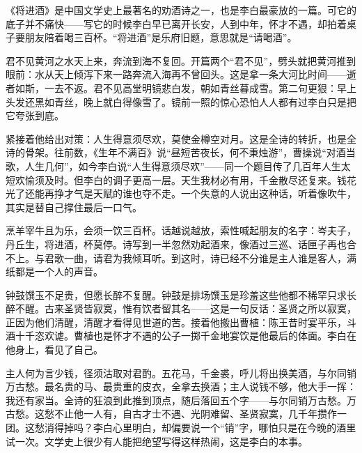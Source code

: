 \begin{appreciation}
《将进酒》是中国文学史上最著名的劝酒诗之一，也是李白最豪放的一篇。可它的底子并不痛快——写它的时候李白早已离开长安，人到中年，怀才不遇，却拍着桌子要朋友陪着喝三百杯。“将进酒”是乐府旧题，意思就是“请喝酒”。

君不见黄河之水天上来，奔流到海不复回。开篇两个“君不见”，劈头就把黄河推到眼前：水从天上倾泻下来一路奔流入海再不曾回头。这是拿一条大河比时间——逝者如斯，一去不返。君不见高堂明镜悲白发，朝如青丝暮成雪。第二句更狠：早上头发还黑如青丝，晚上就白得像雪了。镜前一照的惊心恐怕人人都有过李白只是把它夸张到底。

紧接着他给出对策：人生得意须尽欢，莫使金樽空对月。这是全诗的转折，也是全诗的骨架。往前数，《生年不满百》说“昼短苦夜长，何不秉烛游”，曹操说“对酒当歌，人生几何”，如今李白说“人生得意须尽欢”——同一个题目传了几百年人生太短欢愉须及时。但李白的调子更高一层。天生我材必有用，千金散尽还复来。钱花光了还能再挣才气是天赋的谁也夺不走。一个失意的人说出这种话，听着像吹牛，其实是替自己撑住最后一口气。

烹羊宰牛且为乐，会须一饮三百杯。话越说越放，索性喊起朋友的名字：岑夫子，丹丘生，将进酒，杯莫停。诗写到一半忽然劝起酒来，像酒过三巡、话匣子再也合不上。与君歌一曲，请君为我倾耳听。到这时，诗已经不分谁是主人谁是客人，满纸都是一个人的声音。

钟鼓馔玉不足贵，但愿长醉不复醒。钟鼓是排场馔玉是珍羞这些他都不稀罕只求长醉不醒。古来圣贤皆寂寞，惟有饮者留其名——这是一句反话：圣贤之所以寂寞，正因为他们清醒，清醒才看得见世道的苦。接着他搬出曹植：陈王昔时宴平乐，斗酒十千恣欢谑。曹植也是怀才不遇的公子一掷千金地宴饮是他最后的体面。李白在他身上，看见了自己。

主人何为言少钱，径须沽取对君酌。五花马，千金裘，呼儿将出换美酒，与尔同销万古愁。最名贵的马、最贵重的皮衣，全拿去换酒；主人说钱不够，他大手一挥：我还有家当。全诗的狂浪到此推到顶点，随后落回五个字——与尔同销万古愁。万古愁。这愁不止他一人有，自古才士不遇、光阴难留、圣贤寂寞，几千年攒作一团。这愁消得掉吗？李白心里明白，却偏要说一个“销”字，哪怕只是在今晚的酒里试一次。文学史上很少有人能把绝望写得这样热闹，这是李白的本事。
\end{appreciation}
